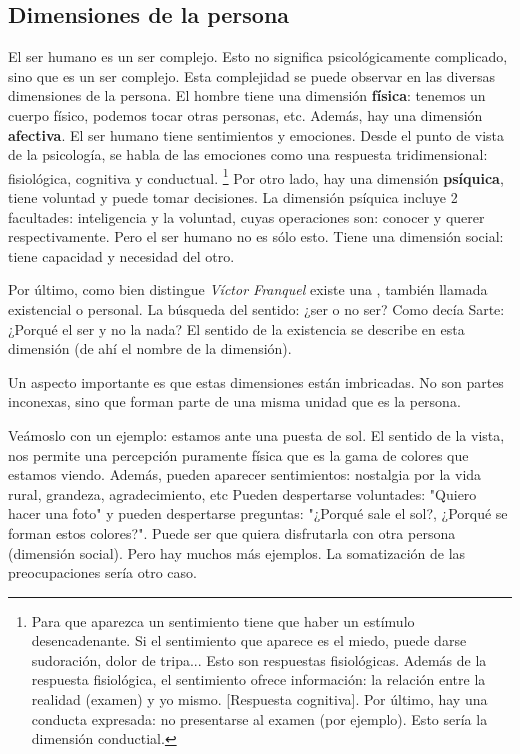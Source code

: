 \documentclass[palatino]{apuntesURJC}
\begin{document}

\subsection{Dimensiones de la persona}

El ser humano es un ser complejo. 
%
Esto no significa psicológicamente complicado, sino que es un ser complejo.
%
Esta complejidad se puede observar en las diversas dimensiones de la persona.
%
El hombre tiene una dimensión \textbf{física}: tenemos un cuerpo físico, podemos tocar otras personas, etc. Además, hay una dimensión \textbf{afectiva}.  
%
El ser humano tiene sentimientos y emociones.
%
Desde el punto de vista de la psicología, se habla de las emociones como una respuesta tridimensional:  fisiológica, cognitiva y conductual.
%
\footnote{Para que aparezca un sentimiento tiene que haber un estímulo desencadenante.
%
Si el sentimiento que aparece es el miedo, puede darse sudoración, dolor de tripa... Esto son respuestas fisiológicas.
%
Además de la respuesta fisiológica, el sentimiento ofrece información: la relación entre la realidad (examen) y yo mismo. [Respuesta cognitiva].
%
Por último, hay una conducta expresada: no presentarse al examen (por ejemplo).
%
Esto sería la dimensión conductial.}
%
Por otro lado, hay una dimensión \textbf{psíquica}, tiene voluntad y puede tomar decisiones.
%
La dimensión psíquica incluye 2 facultades: inteligencia y la voluntad, cuyas operaciones son: conocer y querer respectivamente.
%
Pero el ser humano no es sólo esto.
%
Tiene una dimensión social: tiene capacidad y necesidad del otro.

Por último, como bien distingue \textit{Víctor Franquel} existe una , también llamada existencial o personal.
%
La búsqueda del sentido: ¿ser o no ser? Como decía Sarte: ¿Porqué el ser y no la nada?
%
El sentido de la existencia se describe en esta dimensión (de ahí el nombre de la dimensión).

Un aspecto importante es que estas dimensiones están imbricadas. 
%
No son partes inconexas, sino que forman parte de una misma unidad que es la persona. 

Veámoslo con un ejemplo: estamos ante una puesta de sol. 
%
El sentido de la vista, nos permite una percepción puramente física que es la gama de colores que estamos viendo.
%
Además, pueden aparecer sentimientos: nostalgia por la vida rural, grandeza, agradecimiento, etc
%
Pueden despertarse voluntades: "Quiero hacer una foto" y pueden despertarse preguntas: "¿Porqué sale el sol?, ¿Porqué se forman estos colores?".
%
Puede ser que quiera disfrutarla con otra persona (dimensión social). 
%
Pero hay muchos más ejemplos. 
%
La somatización de las preocupaciones sería otro caso.
\end{document}
